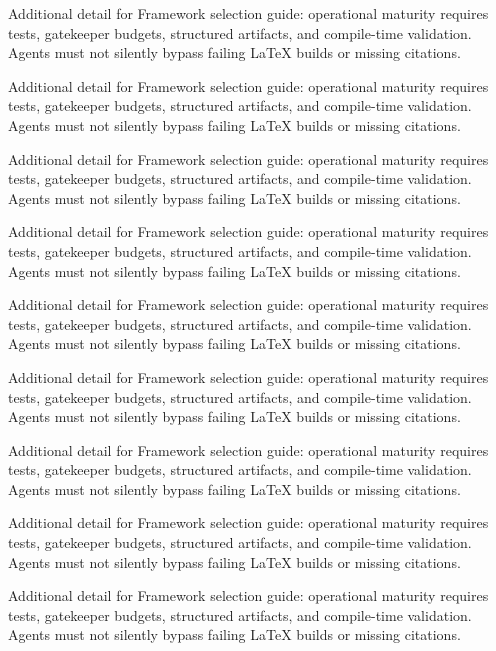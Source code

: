 Additional detail for Framework selection guide: operational maturity requires tests, gatekeeper budgets, structured artifacts, and compile-time validation. Agents must not silently bypass failing LaTeX builds or missing citations. \cite{crewai2024} \cite{langgraph2024}

Additional detail for Framework selection guide: operational maturity requires tests, gatekeeper budgets, structured artifacts, and compile-time validation. Agents must not silently bypass failing LaTeX builds or missing citations. \cite{crewai2024} \cite{langgraph2024}

Additional detail for Framework selection guide: operational maturity requires tests, gatekeeper budgets, structured artifacts, and compile-time validation. Agents must not silently bypass failing LaTeX builds or missing citations. \cite{crewai2024} \cite{langgraph2024}

Additional detail for Framework selection guide: operational maturity requires tests, gatekeeper budgets, structured artifacts, and compile-time validation. Agents must not silently bypass failing LaTeX builds or missing citations. \cite{crewai2024} \cite{langgraph2024}

Additional detail for Framework selection guide: operational maturity requires tests, gatekeeper budgets, structured artifacts, and compile-time validation. Agents must not silently bypass failing LaTeX builds or missing citations. \cite{crewai2024} \cite{langgraph2024}

Additional detail for Framework selection guide: operational maturity requires tests, gatekeeper budgets, structured artifacts, and compile-time validation. Agents must not silently bypass failing LaTeX builds or missing citations. \cite{crewai2024} \cite{langgraph2024}

Additional detail for Framework selection guide: operational maturity requires tests, gatekeeper budgets, structured artifacts, and compile-time validation. Agents must not silently bypass failing LaTeX builds or missing citations. \cite{crewai2024} \cite{langgraph2024}

Additional detail for Framework selection guide: operational maturity requires tests, gatekeeper budgets, structured artifacts, and compile-time validation. Agents must not silently bypass failing LaTeX builds or missing citations. \cite{crewai2024} \cite{langgraph2024}

Additional detail for Framework selection guide: operational maturity requires tests, gatekeeper budgets, structured artifacts, and compile-time validation. Agents must not silently bypass failing LaTeX builds or missing citations. \cite{crewai2024} \cite{langgraph2024}

